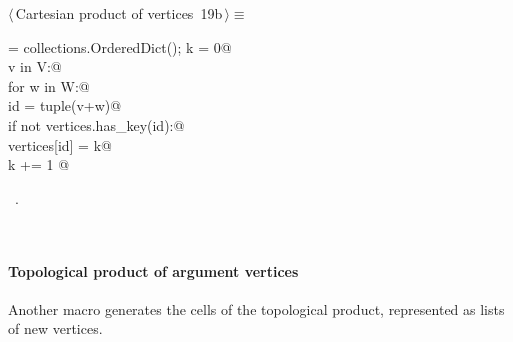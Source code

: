 \documentclass[11pt,oneside]{article}	%
\begin{document}
\begin{flushleft} \small
\begin{minipage}{\linewidth} \label{scrap29}
\protect{}$\langle\,$Cartesian product of vertices\nobreak\ {\footnotesize 19b}$\,\rangle\equiv$
\vspace{-1ex}
\begin{list}{}{} \item
\mbox{}\verb@vertices = collections.OrderedDict(); k = 0@\\
\mbox{}\verb@for v in V:@\\
\mbox{}\verb@    for w in W:@\\
\mbox{}\verb@        id = tuple(v+w)@\\
\mbox{}\verb@        if not vertices.has_key(id):@\\
\mbox{}\verb@            vertices[id] = k@\\
\mbox{}\verb@            k += 1   @{\NWsep}
\end{list}
\vspace{-1ex}
\footnotesize\addtolength{\baselineskip}{-1ex}
\begin{list}{}{\setlength{\itemsep}{-\parsep}\setlength{\itemindent}{-\leftmargin}}
\item \NWtxtMacroRefIn\ .
\end{list}
\end{minipage}\\[4ex]
\end{flushleft}


\paragraph{Topological product of argument vertices}
Another macro generates the cells of the topological product, represented as lists of new vertices. 
\end{document}
